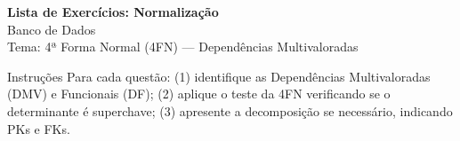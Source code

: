 \documentclass[12pt]{article}
\begin{document}
\vspace*{0.2cm}
\begin{center}
  {\Large \textbf{Lista de Exercícios: Normalização}}\\[0.2cm]
  {\large Banco de Dados}\\[0.2cm]
  Tema: 4ª Forma Normal (4FN) --- Dependências Multivaloradas
\end{center}

\vspace{0.3cm}

\begin{block}{Instruções}
Para cada questão: (1) identifique as Dependências Multivaloradas (DMV) e Funcionais (DF); (2) aplique o teste da 4FN verificando se o determinante é superchave; (3) apresente a decomposição se necessário, indicando PKs e FKs.
\end{block}

\vspace{0.4cm}
\end{document}
